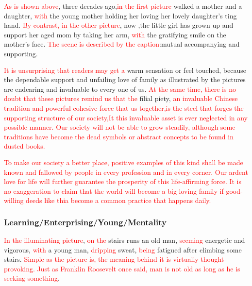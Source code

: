 \documentclass{article}
\begin{document}
\hspace{0.4cm} \textcolor{red}{As is shown above}, three decades ago,\textcolor{red}{in the
  first picture} walked a mother and a daughter, \textcolor{red}{with} the young mother
holding her loving her lovely daughter's ting hand. \textcolor{red}{By contrast, in the
  other picture}, now ,the little girl has grown up and support her aged mom by taking her
arm, \textcolor{red}{with} the gratifying smile on the mother's face. \textcolor{red}{The
  scene is described by the caption}:mutual accompanying and supporting.

\par \textcolor{red}{It is unsurprising that readers may get a} warm sensation or feel
touched, because the dependable support and unfailing love of family as illustrated by the
pictures are endearing and invaluable to every one of us. \textcolor{red}{At the same
  time, there is no doubt that these pictures remind us that the} filial piety,
\textcolor{red}{an invaluable Chinese tradition and powerful cohesive force that us
  together,is the steel that forges the supporting structure of our society,It this
  invaluable asset is ever neglected in any possible manner. Our society will not be able
  to grow steadily, although some traditions have become the dead symbols or abstract
  concepts to be found in dusted books.}

\par \textcolor{red}{To make our society a better place, positive examples of this kind
  shall be made known and fallowed by people in every profession and in every corner. Our
ardent love for life will further guarantee the prosperity of this life-affirming
force. It is no exaggeration to claim that the world will become a big loving family if
good-willing deeds like thia become a common practice that happens daily.}

\subsubsection{Learning/Enterprising/Young/Mentality}
\label{sec:learningenterprising}

\hspace{0.4cm} \textcolor{red}{In the illuminating picture}, \textcolor{red}{on the}
stairs runs an old man, \textcolor{red}{seeming} energetic and vigorous,
\textcolor{red}{with} a young man, \textcolor{red}{dripping} sweat, \textcolor{red}{being}
fatigued after climbing some stairs. \textcolor{red}{Simple as the picture is, the meaning
  behind it is virtually thought-provoking. Just as Franklin Roosevelt once said, man is
  not old as long as he is seeking something}.
\end{document}
